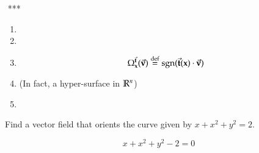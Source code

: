 \begin{proposition} $ $ *** \\[-12pt]
	\begin{enumerate}
		\item {}
		\item {}
		\item {}
		\begin{equation}
			\Omega_{\textbf{x}}^{\vec{\textbf{t}}} (\vec{\textbf{v}}) \overset{\text{def}}{=} \mathrm{sgn} (\vec{\textbf{t}}(\textbf{x})\cdot \vec{\textbf{v}})
		\end{equation}
		\item {} (In fact, a hyper-surface in $\mathbb{R}^n$)
		\item 
	\end{enumerate}
\end{proposition}

 Find a vector field that orients the curve given by $x+x^2+y^2=2$. 

\[x+x^2+y^2-2=0\]
